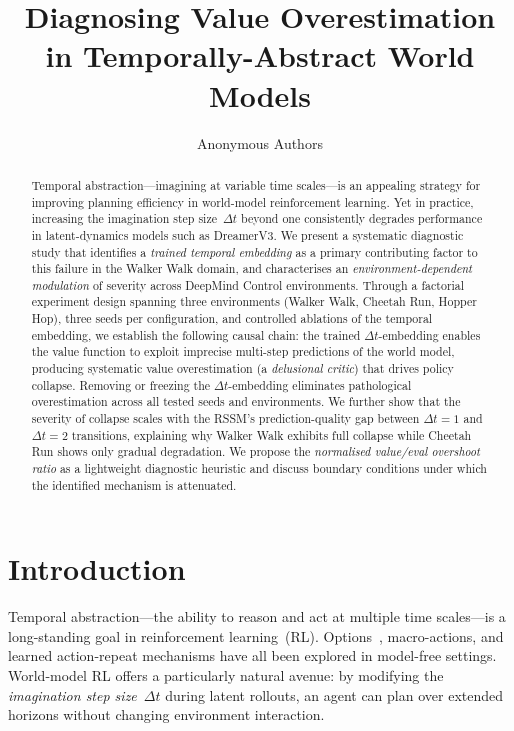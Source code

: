 \documentclass[letterpaper]{article}
\title{Diagnosing Value Overestimation in Temporally-Abstract World Models}
\author[1]{Anonymous Authors}
\affil[1]{Anonymous Institution}
\date{}
\begin{document}
\maketitle

\begin{abstract}
Temporal abstraction---imagining at variable time scales---is an appealing strategy for improving planning efficiency in world-model reinforcement learning.
Yet in practice, increasing the imagination step size~$\Delta t$ beyond one consistently degrades performance in latent-dynamics models such as DreamerV3.
We present a systematic diagnostic study that identifies a \emph{trained temporal embedding} as a primary contributing factor to this failure in the Walker Walk domain, and characterises an \emph{environment-dependent modulation} of severity across DeepMind Control environments.
Through a factorial experiment design spanning three environments (Walker Walk, Cheetah Run, Hopper Hop), three seeds per configuration, and controlled ablations of the temporal embedding, we establish the following causal chain: the trained $\Delta t$-embedding enables the value function to exploit imprecise multi-step predictions of the world model, producing systematic value overestimation (a \emph{delusional critic}) that drives policy collapse.
Removing or freezing the $\Delta t$-embedding eliminates pathological overestimation across all tested seeds and environments.
We further show that the severity of collapse scales with the RSSM's prediction-quality gap between $\Delta t{=}1$ and $\Delta t{=}2$ transitions, explaining why Walker Walk exhibits full collapse while Cheetah Run shows only gradual degradation.
We propose the \emph{normalised value/eval overshoot ratio} as a lightweight diagnostic heuristic and discuss boundary conditions under which the identified mechanism is attenuated.
\end{abstract}

\section{Introduction}

Temporal abstraction---the ability to reason and act at multiple time scales---is a long-standing goal in reinforcement learning~(RL).
Options~\cite{sutton1999options}, macro-actions, and learned action-repeat mechanisms have all been explored in model-free settings.
World-model RL offers a particularly natural avenue: by modifying the \emph{imagination step size}~$\Delta t$ during latent rollouts, an agent can plan over extended horizons without changing environment interaction.
\end{document}
